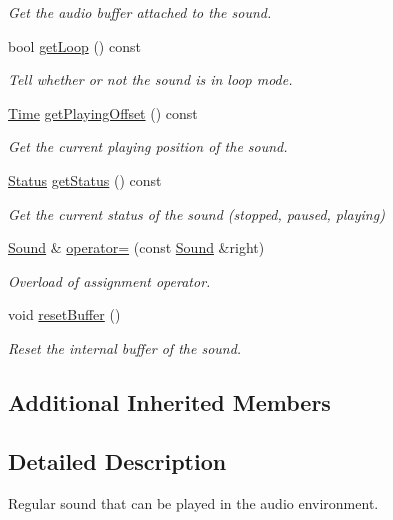 \begin{DoxyCompactItemize}
\begin{DoxyCompactList}\small\item\em Get the audio buffer attached to the sound. \end{DoxyCompactList}\item 
bool \hyperlink{classsf_1_1Sound_a603fbd32b519ae1680c40d8ddfc7ea51}{get\-Loop} () const 
\begin{DoxyCompactList}\small\item\em Tell whether or not the sound is in loop mode. \end{DoxyCompactList}\item 
\hyperlink{classsf_1_1Time}{Time} \hyperlink{classsf_1_1Sound_aeca741a3442d9934369a986ad40f19c0}{get\-Playing\-Offset} () const 
\begin{DoxyCompactList}\small\item\em Get the current playing position of the sound. \end{DoxyCompactList}\item 
\hyperlink{classsf_1_1SoundSource_ac43af72c98c077500b239bc75b812f03}{Status} \hyperlink{classsf_1_1Sound_ae8b4084ff8f460b7a2bf9d39e846dab9}{get\-Status} () const 
\begin{DoxyCompactList}\small\item\em Get the current status of the sound (stopped, paused, playing) \end{DoxyCompactList}\item 
\hyperlink{classsf_1_1Sound}{Sound} \& \hyperlink{classsf_1_1Sound_a08c64c9c1dabeebc59fbf2540d81d4dd}{operator=} (const \hyperlink{classsf_1_1Sound}{Sound} \&right)
\begin{DoxyCompactList}\small\item\em Overload of assignment operator. \end{DoxyCompactList}\item 
void \hyperlink{classsf_1_1Sound_acb7289d45e06fb76b8292ac84beb82a7}{reset\-Buffer} ()
\begin{DoxyCompactList}\small\item\em Reset the internal buffer of the sound. \end{DoxyCompactList}\end{DoxyCompactItemize}
\subsection*{Additional Inherited Members}


\subsection{Detailed Description}
Regular sound that can be played in the audio environment. 

